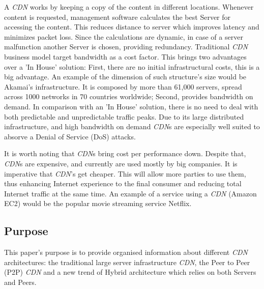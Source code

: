 \documentclass{llncs}
\begin{document}
A \textit{CDN} works by keeping a copy of the content in different locations. Whenever content is requested, management software calculates the best Server for accessing the content. This reduces distance to server which improves latency and minimizes packet loss. 
Since the calculations are dynamic, in case of a server malfunction another Server is chosen, providing redundancy.
Traditional \textit{CDN} business model target bandwidth as a cost factor. This brings two advantages over a 'In House' solution:
First, there are no initial infrastructural costs, this is a big advantage. An example of the dimension of such structure's size would be Akamai's infrastructure. It is composed by more than 61,000 servers, spread across 1000 networks in 70 countries worldwide\cite{akamai};
Second, provides bandwidth on demand. In comparison with an 'In House' solution, there is no need to deal with both predictable and unpredictable traffic peaks.
Due to its large distributed infrastructure, and high bandwidth on demand \textit{CDN}s are especially well suited to absorve a Denial of Service (DoS) attacks\cite{cdnetworks}.

It is worth noting that \textit{CDN}s bring cost per performance down. Despite that, \textit{CDN}s are expensive, and currently are used mostly by big companies. It is imperative that \textit{CDN}'s get cheaper. This will allow more parties to use them, thus enhancing Internet experience to the final consumer and reducing total Internet traffic at the same time.
An example of a service using a \textit{CDN} (Amazon EC2) would be the popular movie streaming service Netflix.


\subsection{Purpose} %
This paper's purpose is to provide organised information about different \textit{CDN} architectures: the traditional large server infrastructure \textit{CDN}, the Peer to Peer (P2P) \textit{CDN} and a new trend of Hybrid architecture which relies on both Servers and Peers. 
\end{document}
